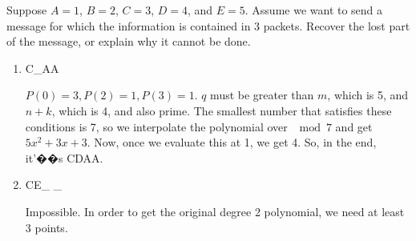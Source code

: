 \question Suppose $A = 1$, $B = 2$, $C = 3$, $D = 4$, and $E = 5$. Assume we want to send a message for which the information is contained in 3 packets. Recover the lost part 
of the message, or explain why it cannot be done. 
\begin{enumerate}
\item C\_AA
\begin{solution}[.4in]
$P(0) = 3, P(2) = 1, P(3) = 1$.  $q$ must be greater than $m$, which is 5, and $n+k$, which is 4, and also prime. The smallest number that satisfies these conditions is 7, so we interpolate the polynomial 
over $\mod 7$ and get $5x^2 + 3x + 3$. Now, once we evaluate 
this at 1, we get 4. So, in the end, it'��s CDAA.
\end{solution}
\item CE\_ \_
\begin{solution}[.4in]
Impossible. In order to get the original degree 2 polynomial, we 
need at least 3 points. 
\end{solution}
\end{enumerate}